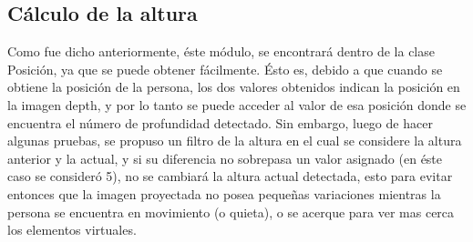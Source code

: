 \documentclass[a4paper,openright,12pt]{report}
\begin{document}
\subsection{Cálculo de la altura}
Como fue dicho anteriormente, éste módulo, se encontrará dentro de la clase Posición, ya que se puede obtener fácilmente. Ésto es, debido a que cuando se obtiene la posición de la persona, los dos valores obtenidos indican la posición en la imagen depth, y por lo tanto se puede acceder al valor de esa posición donde se encuentra el número de profundidad detectado. Sin embargo, luego de hacer algunas pruebas, se propuso un filtro de la altura en el cual se considere la altura anterior y la actual, y si su diferencia no sobrepasa un valor asignado (en éste caso se consideró 5), no se cambiará la altura actual detectada, esto para evitar entonces que la imagen proyectada no posea pequeñas variaciones mientras la persona se encuentra en movimiento (o quieta), o se acerque para ver mas cerca los elementos virtuales.
\end{document}
